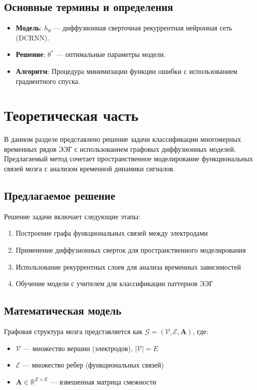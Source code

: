 \documentclass[12pt, twoside]{article}
\begin{document}
\subsection{Основные термины и определения}
\begin{itemize}
    \item \textbf{Модель}: \( h_\theta \) — диффузионная сверточная рекуррентная нейронная сеть (DCRNN).
    \item \textbf{Решение}: \( \theta^* \) — оптимальные параметры модели.
    \item \textbf{Алгоритм}: Процедура минимизации функции ошибки с использованием градиентного спуска.
\end{itemize}


\section{Теоретическая часть}

В данном разделе представлено решение задачи классификации многомерных временных рядов ЭЭГ с использованием графовых диффузионных моделей. Предлагаемый метод сочетает пространственное моделирование функциональных связей мозга с анализом временной динамики сигналов.

\subsection{Предлагаемое решение}

Решение задачи включает следующие этапы:

\begin{enumerate}
    \item Построение графа функциональных связей между электродами
    \item Применение диффузионных сверток для пространственного моделирования
    \item Использование рекуррентных слоев для анализа временных зависимостей
    \item Обучение модели с учителем для классификации паттернов ЭЭГ
\end{enumerate}

\subsection{Математическая модель}

Графовая структура мозга представляется как $\mathcal{G} = (\mathcal{V}, \mathcal{E}, \mathbf{A})$, где:
\begin{itemize}
    \item $\mathcal{V}$ — множество вершин (электродов), $|\mathcal{V}| = E$
    \item $\mathcal{E}$ — множество ребер (функциональных связей)
    \item $\mathbf{A} \in \mathbb{R}^{E \times E}$ — взвешенная матрица смежности
\end{itemize}
\end{document}
